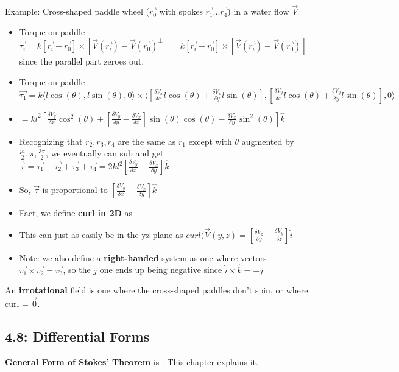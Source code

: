 \documentclass[11pt, oneside]{article}   	%
\begin{document}
Example: Cross-shaped paddle wheel ($\vec{r_0}$ with spokes $\vec{r_1} ... \vec{r_4}$) in a water flow $\vec{V}$
\begin{itemize}
\item Torque on paddle $\vec{\tau_i} = k[\vec{r_i} - \vec{r_0}] \times [\vec{V}(\vec{r_i}) - \vec{V}(\vec{r_0})^\perp] =  k[\vec{r_i} - \vec{r_0}] \times [\vec{V}(\vec{r_i}) - \vec{V}(\vec{r_0})]$ since the parallel part zeroes out.
\item Torque on paddle $\vec{\tau_1} = k\langle l\cos(\theta), l\sin(\theta), 0\rangle \times
\langle [\frac{\delta V_x}{\delta x} l \cos(\theta) + \frac{\delta V_x}{\delta y} l \sin(\theta)],
[\frac{\delta V_y}{\delta x} l \cos(\theta) + \frac{\delta V_y}{\delta y} l \sin(\theta)], 0\rangle$
\item $= kl^2[\frac{\delta V_y}{\delta x}\cos^2(\theta) + [\frac{\delta V_y}{\delta y} - \frac{\delta V_x}{\delta x}]\sin(\theta)\cos(\theta) - \frac{\delta V_x}{\delta y} \sin^2(\theta)]\hat{k}$
\item Recognizing that $r_2, r_3, r_4$ are the same as $r_1$ except with $\theta$ augmented by $\frac{pi}{2}, \pi, \frac{3\pi}{2}$, we eventually can sub and get 
$\vec{\tau} = \vec{\tau_1} + \vec{\tau_2} + \vec{\tau_3} +\vec{\tau_4} = 2kl^2[\frac{\delta V_y}{\delta x} - \frac{\delta V_x}{\delta y}]\hat{k}$
\item So, $\vec{\tau}$ is proportional to $[\frac{\delta V_y}{\delta x} - \frac{\delta V_x}{\delta y}]\hat{k}$
\item Fact, we define \textbf{curl in 2D} as 
\item This can just as easily be in the yz-plane as $curl(\vec{V}(y,z) = [\frac{\delta V_z}{\delta y} - \frac{\delta V_y}{\delta z}]\hat{i}$
\item Note: we also define a \textbf{right-handed} system as one where vectors $\vec{v_1} \times \vec{v_2} = \vec{v_3}$, so the $j$ one ends up being negative since $\hat{i} \times \hat{k} = -\hat{j}$
\end{itemize}

An \textbf{irrotational} field is one where the cross-shaped paddles don't spin, or where curl = $\vec{0}$.

\subsection{4.8: Differential Forms}

\textbf{General Form of Stokes' Theorem} is .  This chapter explains it.
\end{document}
